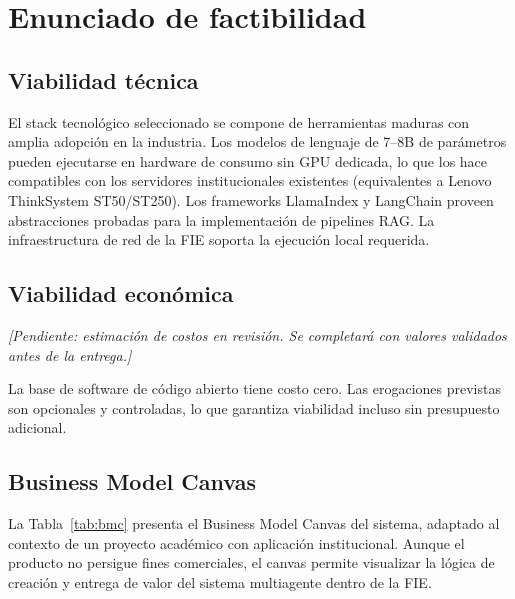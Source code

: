 \documentclass[a4paper, 12pt]{article}
\begin{document}
\section{Enunciado de factibilidad}
\label{sec:factibilidad}

\subsection{Viabilidad t\'ecnica}

El stack tecnol\'ogico seleccionado se compone de herramientas maduras con amplia adopci\'on en la industria. Los modelos de lenguaje de 7--8B de par\'ametros pueden ejecutarse en hardware de consumo sin GPU dedicada, lo que los hace compatibles con los servidores institucionales existentes (equivalentes a Lenovo ThinkSystem ST50/ST250). Los frameworks LlamaIndex y LangChain proveen abstracciones probadas para la implementaci\'on de pipelines RAG. La infraestructura de red de la \ac{FIE} soporta la ejecuci\'on local requerida.

\subsection{Viabilidad econ\'omica}


\textit{[Pendiente: estimaci\'on de costos en revisi\'on. Se completar\'a con valores validados antes de la entrega.]}

\noindent La base de software de c\'odigo abierto tiene costo cero. Las erogaciones previstas son opcionales y controladas, lo que garantiza viabilidad incluso sin presupuesto adicional.

\subsection{Business Model Canvas}

La Tabla~\ref{tab:bmc} presenta el Business Model Canvas del sistema, adaptado al contexto de un proyecto acad\'emico con aplicaci\'on institucional. Aunque el producto no persigue fines comerciales, el canvas permite visualizar la l\'ogica de creaci\'on y entrega de valor del sistema multiagente dentro de la \ac{FIE}.
\end{document}
